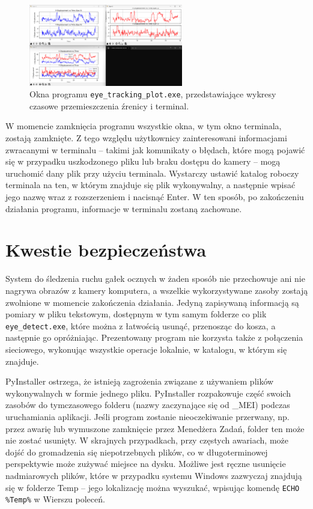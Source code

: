 \documentclass[a4paper,twoside,12pt]{book}
\begin{document}
\begin{figure}[htbp]
	\centering
	\includegraphics[width=0.6\textwidth]{pic/obsługa/wykresy.png}
	\caption{Okna programu \texttt{eye\_\-tracking\_\-plot.exe}, przedstawiające wykresy czasowe przemieszczenia źrenicy i terminal.}
	\label{fig:eye_tracking_plot-wykresy-i-terminal}
\end{figure}

W momencie zamknięcia programu wszystkie okna, w tym okno terminala,
zostają zamknięte. Z tego względu użytkownicy zainteresowani informacjami zwracanymi w
terminalu -- takimi jak komunikaty o błędach, które mogą pojawić się w przypadku
uszkodzonego pliku lub braku dostępu do kamery -- mogą uruchomić dany plik przy użyciu
terminala. Wystarczy ustawić katalog roboczy terminala na ten, w którym znajduje
się plik wykonywalny, a następnie wpisać jego nazwę wraz z rozszerzeniem i nacisnąć Enter.
W ten sposób, po zakończeniu działania programu, informacje w terminalu zostaną
zachowane.

\section{Kwestie bezpieczeństwa}
\label{sec:Kwestie-bezpieczenstwa}

System do śledzenia ruchu gałek ocznych w żaden sposób nie przechowuje ani nie
nagrywa obrazów z kamery komputera, a wszelkie wykorzystywane zasoby zostają zwolnione
w momencie zakończenia działania. Jedyną zapisywaną informacją są pomiary w
pliku tekstowym, dostępnym w tym samym folderze co plik \texttt{eye\_\-detect.exe}, które można
z łatwością usunąć, przenosząc do kosza, a następnie go opróżniając. Prezentowany program
nie korzysta także z połączenia sieciowego, wykonując wszystkie operacje lokalnie,
w katalogu, w którym się znajduje.

PyInstaller ostrzega, że istnieją zagrożenia związane z używaniem plików wykonywalnych
w formie jednego pliku. PyInstaller rozpakowuje część swoich zasobów do
tymczasowego folderu (nazwy zaczynające się od \_MEI) podczas uruchamiania aplikacji.
Jeśli program zostanie nieoczekiwanie przerwany, np. przez awarię lub wymuszone
zamknięcie przez Menedżera Zadań, folder ten może nie zostać usunięty. W skrajnych przypadkach,
przy częstych awariach, może dojść do gromadzenia się niepotrzebnych plików, co w
długoterminowej perspektywie może zużywać miejsce na dysku. Możliwe jest ręczne
usunięcie nadmiarowych plików, które w przypadku systemu Windows zazwyczaj znajdują
się w folderze Temp -- jego lokalizację można wyszukać, wpisując komendę \texttt{ECHO \-\%Temp\%} w Wierszu poleceń. 
\end{document}
